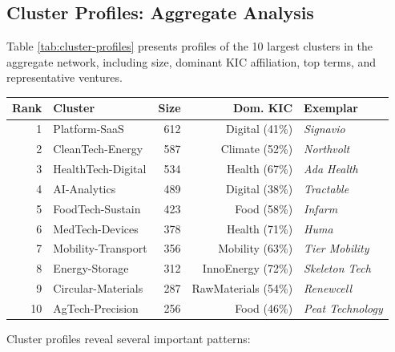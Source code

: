 \documentclass[../main.tex]{subfiles}
\begin{document}
\subsection{Cluster Profiles: Aggregate Analysis}

Table \ref{tab:cluster-profiles} presents profiles of the 10 largest clusters in the aggregate network, including size, dominant KIC affiliation, top terms, and representative ventures.

\begin{center}
\scriptsize
\begin{tabular}{rlrrl}
\toprule
\textbf{Rank} & \textbf{Cluster} & \textbf{Size} & \textbf{Dom. KIC} & \textbf{Exemplar} \\
\midrule
1 & Platform-SaaS & 612 & Digital (41\%) & \textit{Signavio} \\
2 & CleanTech-Energy & 587 & Climate (52\%) & \textit{Northvolt} \\
3 & HealthTech-Digital & 534 & Health (67\%) & \textit{Ada Health} \\
4 & AI-Analytics & 489 & Digital (38\%) & \textit{Tractable} \\
5 & FoodTech-Sustain & 423 & Food (58\%) & \textit{Infarm} \\
6 & MedTech-Devices & 378 & Health (71\%) & \textit{Huma} \\
7 & Mobility-Transport & 356 & Mobility (63\%) & \textit{Tier Mobility} \\
8 & Energy-Storage & 312 & InnoEnergy (72\%) & \textit{Skeleton Tech} \\
9 & Circular-Materials & 287 & RawMaterials (54\%) & \textit{Renewcell} \\
10 & AgTech-Precision & 256 & Food (46\%) & \textit{Peat Technology} \\
\bottomrule
\end{tabular}
\end{center}

Cluster profiles reveal several important patterns:
\end{document}
